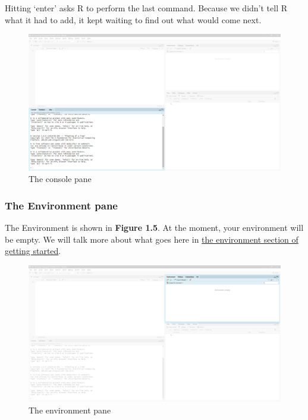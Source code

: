 \documentclass[
]{book}
\begin{document}
Hitting `enter' asks R to perform the last command. Because we didn't tell R what it had to add, it kept waiting to find out what would come next.

\begin{figure}

{\centering \includegraphics{images/02_install/rstud04} 

}

\caption{The console pane}\label{fig:unnamed-chunk-9}
\end{figure}

\hypertarget{the-environment-pane}{%
\subsubsection{The Environment pane}\label{the-environment-pane}}

The Environment is shown in \textbf{Figure 1.5}. At the moment, your environment will be empty. We will talk more about what goes here in \protect\hyperlink{environment}{the environment section of getting started}.

\begin{figure}

{\centering \includegraphics{images/02_install/rstud05} 

}

\caption{The environment pane}\label{fig:unnamed-chunk-10}
\end{figure}
\end{document}
